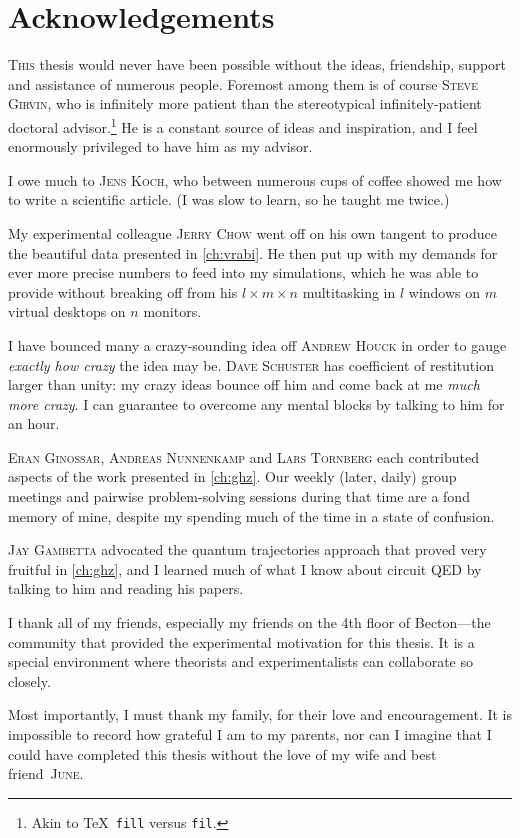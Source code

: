 %
\chapter{Acknowledgements}\newcommand{\tnk}{\textsc}
\lettrine{T}{his} thesis would never have been possible without the ideas, friendship, support and assistance of numerous people.  Foremost among them is of course \tnk{Steve Girvin}, who is infinitely more patient than the stereotypical infinitely-patient doctoral advisor.\footnote{Akin to \TeX\ \texttt{fill} versus \texttt{fil}.} He is a constant source of ideas and inspiration, and I feel enormously privileged to have him as my advisor.

I owe much to \tnk{Jens Koch}, who between numerous cups of coffee showed me how to write a scientific article. (I was slow to learn, so he taught me twice.)

My experimental colleague \tnk{Jerry Chow} went off on his own tangent to produce the beautiful data presented in \cref{ch:vrabi}. He then put up with my demands for ever more precise numbers to feed into my simulations, which he was able to provide without breaking off from his $l\times m\times n$ multitasking in $l$ windows on $m$ virtual desktops on $n$ monitors.

I have bounced many a crazy-sounding idea off \tnk{Andrew Houck} in order to gauge \emph{exactly how crazy} the idea may be. \tnk{Dave Schuster} has coefficient of restitution larger than unity: my crazy ideas bounce off him and come back at me \emph{much more crazy}. I can guarantee to overcome any mental blocks by talking to him for an hour.

\tnk{Eran Ginossar}, \tnk{Andreas Nunnenkamp} and \tnk{Lars Tornberg} each contributed aspects of the work presented in \cref{ch:ghz}. Our weekly (later, daily) group meetings and pairwise problem-solving sessions during that time are a fond memory of mine, despite my spending much of the time in a state of confusion.

\tnk{Jay Gambetta} advocated the quantum trajectories approach that proved very fruitful in \cref{ch:ghz}, and I learned much of what I know about circuit QED by talking to him and reading his papers.

I thank all of my friends, especially my friends on the 4th floor of Becton---the community that provided the experimental motivation for this thesis. It is a special environment where theorists and experimentalists can collaborate so closely.

Most importantly, I must thank my family, for their love and encouragement. It is impossible to record how grateful I am to my parents, nor can I imagine that I could have completed this thesis without the love of my wife and best friend~\tnk{June}. 